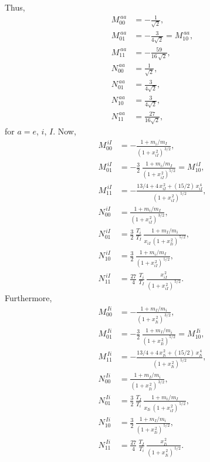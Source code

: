 \documentclass[12pt]{article}
\begin{document}
Thus, 
\begin{align}
M^{\,aa}_{00} &= -\frac{1}{\sqrt{2}},\\[0.5ex]
M^{\,aa}_{01}&= -\frac{3}{4\sqrt{2}}= M^{\,aa}_{10},\\[0.5ex]
M^{\,aa}_{11}& = -\frac{59}{16\,\sqrt{2}},\\[0.5ex]
N^{\,aa}_{00} &= \frac{1}{\sqrt{2}},\\[0.5ex]
N^{\,aa}_{01}&= \frac{3}{4\sqrt{2}},\\[0.5ex]
N^{\,aa}_{10}&=\frac{3}{4\sqrt{2}},\\[0.5ex]
N^{\,aa}_{11}& =\frac{27}{16\sqrt{2}},
\end{align}
for $a=e$, $i$, $I$.  Now, 
\begin{align}
M^{\,iI}_{00} &= -\frac{1+m_i/m_I}{(1+x_{iI}^{\,2})^{\,3/2}},\\[0.5ex]
M^{\,iI}_{01}&= -\frac{3}{2}\,\frac{1+m_i/m_I}{(1+x_{iI}^{\,2})^{5/2}}= M^{\,iI}_{10},\\[0.5ex]
M^{\,iI}_{11}& = -\frac{13/4+4\,x_{iI}^{\,2}+(15/2)\,x_{iI}^{\,4}}{(1+x_{iI}^{\,2})^{\,5/2}},\\[0.5ex]
N^{\,iI}_{00} &= \frac{1+m_i/m_I}{(1+x_{iI}^{\,2})^{\,3/2}},\\[0.5ex]
N^{\,iI}_{01}&= \frac{3}{2}\,\frac{T_i}{T_I}\,\frac{1+m_I/m_i}{x_{iI}\,(1+x_{Ii}^{\,2})^{\,5/2}},\\[0.5ex]
N^{\,iI}_{10}&=\frac{3}{2}\,\frac{1+m_i/m_I}{(1+x_{iI}^{\,2})^{\,5/2}},\\[0.5ex]
N^{\,iI}_{11}& =\frac{27}{4}\,\frac{T_i}{T_I}\,\frac{x_{iI}^{\,2}}{(1+x_{iI}^{\,2})^{\,5/2}}.
\end{align}
Furthermore, 
\begin{align}
M^{\,Ii}_{00} &= -\frac{1+m_I/m_i}{(1+x_{Ii}^{\,2})^{\,3/2}},\\[0.5ex]
M^{\,Ii}_{01}&= -\frac{3}{2}\,\frac{1+m_I/m_i}{(1+x_{Ii}^{\,2})^{5/2}}= M^{\,Ii}_{10},\\[0.5ex]
M^{\,Ii}_{11}& = -\frac{13/4+4\,x_{Ii}^{\,2}+(15/2)\,x_{Ii}^{\,4}}{(1+x_{Ii}^{\,2})^{\,5/2}},\\[0.5ex]
N^{\,Ii}_{00} &= \frac{1+m_I/m_i}{(1+x_{Ii}^{\,2})^{\,3/2}},\\[0.5ex]
N^{\,Ii}_{01}&= \frac{3}{2}\,\frac{T_I}{T_i}\,\frac{1+m_i/m_I}{x_{Ii}\,(1+x_{iI}^{\,2})^{\,5/2}},\\[0.5ex]
N^{\,Ii}_{10}&=\frac{3}{2}\,\frac{1+m_I/m_i}{(1+x_{Ii}^{\,2})^{\,5/2}},\\[0.5ex]
N^{\,Ii}_{11}& =\frac{27}{4}\,\frac{T_I}{T_i}\,\frac{x_{Ii}^{\,2}}{(1+x_{Ii}^{\,2})^{\,5/2}}.
\end{align}
\end{document}
